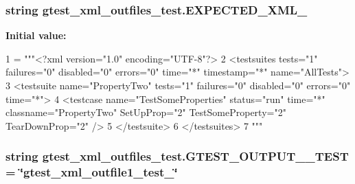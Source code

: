 \hypertarget{namespacegtest__xml__outfiles__test_a765455244a8cd7b3f32a51f0cda4157e}{
\subsubsection[{E\-X\-P\-E\-C\-T\-E\-D\-\_\-\-X\-M\-L\-\_\-2}]{\setlength{\rightskip}{0pt plus 5cm}string gtest\-\_\-xml\-\_\-outfiles\-\_\-test.\-E\-X\-P\-E\-C\-T\-E\-D\-\_\-\-X\-M\-L\-\_}}\label{namespacegtest__xml__outfiles__test_a765455244a8cd7b3f32a51f0cda4157e}
{\bfseries Initial value\-:}
\begin{DoxyCode}
1 = \textcolor{stringliteral}{"""<?xml version="1.0" encoding="UTF-8"?>}
2 \textcolor{stringliteral}{<testsuites tests="1" failures="0" disabled="0" errors="0" time="*" timestamp="*" name="AllTests">}
3 \textcolor{stringliteral}{  <testsuite name="PropertyTwo" tests="1" failures="0" disabled="0" errors="0" time="*">}
4 \textcolor{stringliteral}{    <testcase name="TestSomeProperties" status="run" time="*" classname="PropertyTwo" SetUpProp="2"
       TestSomeProperty="2" TearDownProp="2" />}
5 \textcolor{stringliteral}{  </testsuite>}
6 \textcolor{stringliteral}{</testsuites>}
7 \textcolor{stringliteral}{"""}
\end{DoxyCode}
\hypertarget{namespacegtest__xml__outfiles__test_a92ab09e944d010f8abfaa3ca453fa68c}{
\subsubsection[{G\-T\-E\-S\-T\-\_\-\-O\-U\-T\-P\-U\-T\-\_\-1\-\_\-\-T\-E\-S\-T}]{\setlength{\rightskip}{0pt plus 5cm}string gtest\-\_\-xml\-\_\-outfiles\-\_\-test.\-G\-T\-E\-S\-T\-\_\-\-O\-U\-T\-P\-U\-T\-\_\-\_\-\-T\-E\-S\-T = \char`\"{}gtest\-\_\-xml\-\_\-outfile1\-\_\-test\-\_\-\char`\"{}}}\label{namespacegtest__xml__outfiles__test_a92ab09e944d010f8abfaa3ca453fa68c}
